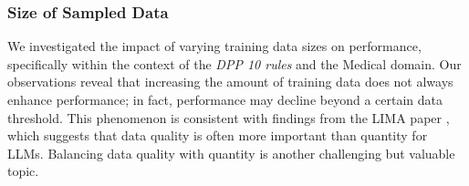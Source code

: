 \documentclass{article}
\newcommand{\mytiny}{\fontsize{8pt}{10pt}\selectfont}
\begin{document}
\begin{table}[H]
    \centering
    \mytiny
    \caption{Code fine-tuning on Llama3-8B using 20K selected data samples from our SlimPajama data source. Instead of using 10 rules, 20 rules were selected during the rule selection step.}
    \label{tab:vary_num_rules}
\end{table}


\subsubsection{Size of Sampled Data}
We investigated the impact of varying training data sizes on performance, specifically within the context of the \textit{DPP 10 rules} and the Medical domain. Our observations reveal that increasing the amount of training data does not always enhance performance; in fact, performance may decline beyond a certain data threshold. This phenomenon is consistent with findings from the LIMA paper \citep{zhou2024lima}, which suggests that data quality is often more important than quantity for LLMs. Balancing data quality with quantity is another challenging but valuable topic.
\begin{table}[H]
    \centering
    \mytiny
    \caption{Medical fine-tuning on Pythia-1B using various sizes of training data selected by DPP with 10 rules.}
    \label{tab:vary_data_size}
\end{table}
\end{document}
